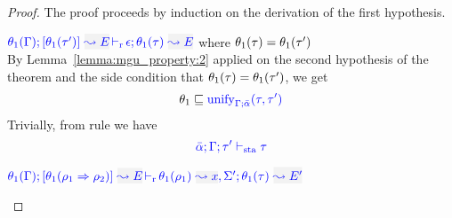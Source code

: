 \begin{proof}
The proof proceeds by induction on the derivation of the first hypothesis.
\begin{description}
\setlength{\itemsep}{1em}
\item[\fbox{\rref{M-Simp}}]\quad
$\dmres{\theta_1(\tenv)}{\theta_1(\type')}{E}{\theta_1(\type)}{E}{\epsilon}$ \quad where $\theta_1(\tau) = \theta_1(\tau')$ \\

By Lemma~\ref{lemma:mgu_property:2} applied on the second hypothesis of the theorem
and the side condition that $\theta_1(\tau) = \theta_1(\tau')$, we get
\begin{equation*}
  \theta_1\sqsubseteq{\color{blue} \mathrm{unify}_{\Gamma;\bar{\alpha}}(\tau,\tau')}
\end{equation*}
Trivially, from rule  we have
\begin{equation*}
  {\color{blue} \bar\alpha; \Gamma; \tau' \vdash_{\mathrm{sta}}\tau}
\end{equation*}

\item[\fbox{\rref{M-IApp}}]\quad
$\dmres{\theta_1(\tenv)}{\theta_1(\rulet_1\To\rulet_2)}{E}{\theta_1(\type)}{E'}{\ie{\theta_1(\rulet_1)}{x},\Sigma'}$\ \\


\end{description}
\end{proof}
